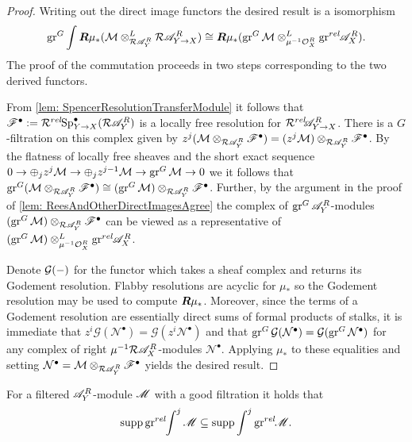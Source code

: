 \begin{proof}
  Writing out the direct image functors the desired result is a isomorphism $$\operatorname{gr}^G\int\boldsymbol{R}\mu_*(\mathcal{M}\otimes^L_{\mathcal{R}\mathscr{A}_Y^R} \mathcal{R}\mathscr{A}_{Y\to X}^R)  \cong \boldsymbol{R}\mu_*(\operatorname{gr}^G\mathcal{M}\otimes^L_{\mu^{-1}\mathcal{O}_X^R}\operatorname{gr}^{rel}\mkern-5mu\mathscr{A}_X^R).$$
  The proof of the commutation proceeds in two steps corresponding to the two derived functors.

  From \cref{lem: SpencerResolutionTransferModule} it follows that $\mathscr{F}^\bullet := \mathcal{R}^{rel}\mkern-5mu\operatorname{Sp}^\bullet_{Y\to X}(\mathcal{R}\mathscr{A}_Y^R)$ is a locally free resolution for $\mathcal{R}^{rel}\mkern-5mu\mathscr{A}_{Y\to X}^R$. 
  There is a $G$-filtration on this complex given by $z^j(\mathcal{M}\otimes_{\mathcal{R}\mathscr{A}_Y^R} \mathscr{F}^\bullet) = (z^j\mathcal{M})\otimes_{\mathcal{R}\mathscr{A}_Y^R} \mathscr{F}^\bullet$.
  By the flatness of locally free sheaves and the short exact sequence $0\to \oplus_j z^j \mathcal{M} \to \oplus_j z^{j-1}\mathcal{M} \to \operatorname{gr}^G \mathcal{M} \to 0$ we it follows that $\operatorname{gr}^G(\mathcal{M}\otimes_{\mathcal{R}\mathscr{A}_Y^R} \mathscr{F}^\bullet) \cong (\operatorname{gr}^G\mathcal{M})\otimes_{\mathcal{R}\mathscr{A}_Y^R} \mathscr{F}^\bullet$.
  Further, by the argument in the proof of \cref{lem: ReesAndOtherDirectImagesAgree} the complex of $\operatorname{gr}^G\mathscr{A}_Y^R$-modules  $(\operatorname{gr}^G\mathcal{M})\otimes_{\mathcal{R}\mathscr{A}_Y^R} \mathscr{F}^\bullet$ can be viewed as a representative of $(\operatorname{gr}^G\mathcal{M})\otimes^L_{\mu^{-1}\mathcal{O}_X^R}\operatorname{gr}^{rel}\mkern-5mu\mathscr{A}_X^R$.

  Denote $\mathcal{G}({-})$ for the functor which takes a sheaf complex and returns its Godement resolution.
  Flabby resolutions are acyclic for $\mu_*$ so the Godement resolution may be used to compute $\boldsymbol{R}\mu_*$.
  Moreover, since the terms of a Godement resolution are essentially direct sums of formal products of stalks, it is immediate that $z^i \mathcal{G}(\mathcal{N}^\bullet) = \mathcal{G}(z^i\mathcal{N}^\bullet)$ and that $\operatorname{gr}^G\mathcal{G}(\mathcal{N}^\bullet) =\mathcal{G}(\operatorname{gr}^G\mathcal{N}^\bullet)$ for any complex of right $\mu^{-1}\mathcal{R}\mathscr{A}_X^R$-modules $\mathcal{N}^\bullet$.
  Applying $\mu_*$ to these equalities and setting $\mathcal{N}^\bullet = \mathcal{M}\otimes_{\mathcal{R}\mathscr{A}_Y^R} \mathscr{F}^\bullet$ yields the desired result.
\end{proof}
\begin{proposition}
  For a filtered $\mathscr{A}_Y^R$-module $\mathscr{M}$ with a good filtration it holds that  $$\operatorname{supp} \operatorname{gr}^{rel}\mkern-5mu\int^j\mathscr{M} \subseteq \operatorname{supp} \int^j \operatorname{gr}^{rel}\mkern-5mu\mathscr{M}.$$
\end{proposition}
